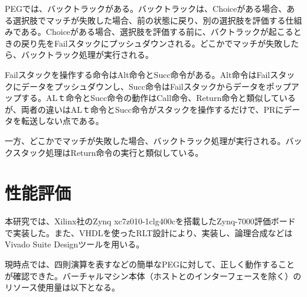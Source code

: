 \documentclass[paper]{ieicej}
\begin{document}




PEGでは、バックトラックがある。バックトラックは、Choiceがある場合、ある選択肢でマッチが失敗した場合、前の状態に戻り、別の選択肢を評価する仕組みである。Choiceがある場合、選択肢を評価する前に、バクトラックが起こるときの戻り先をFailスタックにプッシュダウンされる。どこかでマッチが失敗したら、バックトラック処理が実行される。

Failスタックを操作する命令はAlt命令とSucc命令がある。Alt命令はFailスタックにデータをプッシュダウンし、Succ命令はFailスタックからデータをポップアップする。ALｔ命令とSucc命令の動作はCall命令、Return命令と類似しているが、両者の違いはALｔ命令とSucc命令がスタックを操作するだけで、PRにデータを転送しない点である。

一方、どこかでマッチが失敗した場合、バックトラック処理が実行される。バックスタック処理はReturn命令の実行と類似している。


\section{性能評価}

本研究では、Xilinx社のZynq xc7z010-1clg400cを搭載したZynq-7000評価ボードで実装した。また、VHDLを使ったRLT設計により、実装し、論理合成などはVivado Suite Designツールを用いる。

現時点では、四則演算を表すなどの簡単なPEGに対して、正しく動作することが確認できた。バーチャルマシン本体（ホストとのインターフェースを除く）のリソース使用量は以下となる。
\end{document}
